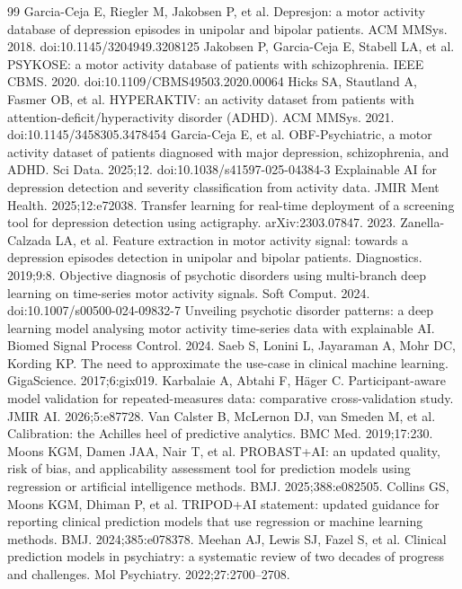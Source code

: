 \documentclass[11pt,a4paper]{article}
\begin{document}
\begin{thebibliography}{99}\footnotesize
{} Garcia-Ceja E, Riegler M, Jakobsen P, et al. Depresjon: a motor activity database of depression episodes in unipolar and bipolar patients. ACM MMSys. 2018. doi:10.1145/3204949.3208125
 Jakobsen P, Garcia-Ceja E, Stabell LA, et al. PSYKOSE: a motor activity database of patients with schizophrenia. IEEE CBMS. 2020. doi:10.1109/CBMS49503.2020.00064
 Hicks SA, Stautland A, Fasmer OB, et al. HYPERAKTIV: an activity dataset from patients with attention-deficit/hyperactivity disorder (ADHD). ACM MMSys. 2021. doi:10.1145/3458305.3478454
 Garcia-Ceja E, et al. OBF-Psychiatric, a motor activity dataset of patients diagnosed with major depression, schizophrenia, and ADHD. Sci Data. 2025;12. doi:10.1038/s41597-025-04384-3
 Explainable AI for depression detection and severity classification from activity data. JMIR Ment Health. 2025;12:e72038.
 Transfer learning for real-time deployment of a screening tool for depression detection using actigraphy. arXiv:2303.07847. 2023.
 Zanella-Calzada LA, et al. Feature extraction in motor activity signal: towards a depression episodes detection in unipolar and bipolar patients. Diagnostics. 2019;9:8.
 Objective diagnosis of psychotic disorders using multi-branch deep learning on time-series motor activity signals. Soft Comput. 2024. doi:10.1007/s00500-024-09832-7
 Unveiling psychotic disorder patterns: a deep learning model analysing motor activity time-series data with explainable AI. Biomed Signal Process Control. 2024.
 Saeb S, Lonini L, Jayaraman A, Mohr DC, Kording KP. The need to approximate the use-case in clinical machine learning. GigaScience. 2017;6:gix019.
 Karbalaie A, Abtahi F, H\"ager C. Participant-aware model validation for repeated-measures data: comparative cross-validation study. JMIR AI. 2026;5:e87728.
 Van Calster B, McLernon DJ, van Smeden M, et al. Calibration: the Achilles heel of predictive analytics. BMC Med. 2019;17:230.
 Moons KGM, Damen JAA, Nair T, et al. PROBAST+AI: an updated quality, risk of bias, and applicability assessment tool for prediction models using regression or artificial intelligence methods. BMJ. 2025;388:e082505.
 Collins GS, Moons KGM, Dhiman P, et al. TRIPOD+AI statement: updated guidance for reporting clinical prediction models that use regression or machine learning methods. BMJ. 2024;385:e078378.
 Meehan AJ, Lewis SJ, Fazel S, et al. Clinical prediction models in psychiatry: a systematic review of two decades of progress and challenges. Mol Psychiatry. 2022;27:2700--2708.
\end{thebibliography}
\end{document}
